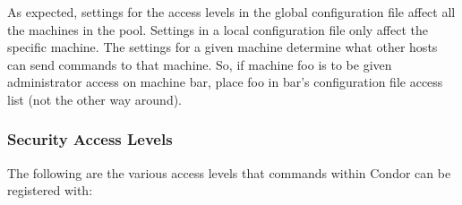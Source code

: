 As expected, settings for the access levels in the global
configuration file affect all the machines in the pool.
Settings in a local configuration file only affect the specific machine.
The settings for a given machine determine what other hosts can send
commands to that machine.
So, if machine foo is to be given 
administrator access on machine bar, place foo in
bar's configuration file access list (not the other way around).

\subsubsection{\label{sec:Security-Access-Levels}Security Access Levels} 

The following are the various access levels that commands within
Condor can be registered with:


